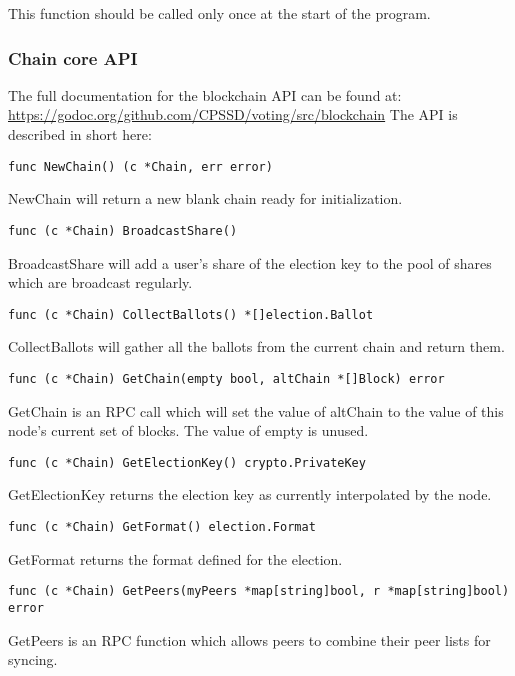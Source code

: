 \documentclass[a4paper,12pt]{article}
\begin{document}
This function should be called only once at the start of the program.

\subsubsection{Chain core API}
The full documentation for the blockchain API can be found at:
\url{https://godoc.org/github.com/CPSSD/voting/src/blockchain}
The API is described in short here:

\begin{Verbatim}[obeytabs,tabsize=4]
func NewChain() (c *Chain, err error)
\end{Verbatim}
NewChain will return a new blank chain ready for initialization.

\begin{Verbatim}[obeytabs,tabsize=4]
func (c *Chain) BroadcastShare()
\end{Verbatim}
BroadcastShare will add a user's share of the election key to the pool of shares which are broadcast regularly.

\begin{Verbatim}[obeytabs,tabsize=4]
func (c *Chain) CollectBallots() *[]election.Ballot
\end{Verbatim}
CollectBallots will gather all the ballots from the current chain and return them.

\begin{Verbatim}[obeytabs,tabsize=4]
func (c *Chain) GetChain(empty bool, altChain *[]Block) error
\end{Verbatim}
GetChain is an RPC call which will set the value of altChain to the value of this node's current set of blocks. The value of empty is unused.

\begin{Verbatim}[obeytabs,tabsize=4]
func (c *Chain) GetElectionKey() crypto.PrivateKey
\end{Verbatim}
GetElectionKey returns the election key as currently interpolated by the node.

\begin{Verbatim}[obeytabs,tabsize=4]
func (c *Chain) GetFormat() election.Format
\end{Verbatim}
GetFormat returns the format defined for the election.

\begin{Verbatim}[obeytabs,tabsize=4]
func (c *Chain) GetPeers(myPeers *map[string]bool, r *map[string]bool) error
\end{Verbatim}
GetPeers is an RPC function which allows peers to combine their peer lists for syncing.
\end{document}
